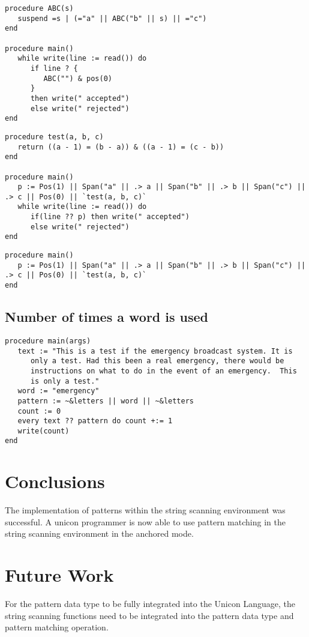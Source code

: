 \documentclass{article}
\begin{document}
\begin{verbatim}
procedure ABC(s)
   suspend =s | (="a" || ABC("b" || s) || ="c")
end

procedure main()
   while write(line := read()) do
      if line ? {
         ABC("") & pos(0)
      } 
      then write(" accepted")
      else write(" rejected")
end
\end{verbatim}

\begin{verbatim}
procedure test(a, b, c)
   return ((a - 1) = (b - a)) & ((a - 1) = (c - b))
end

procedure main()
   p := Pos(1) || Span("a" || .> a || Span("b" || .> b || Span("c") || .> c || Pos(0) || `test(a, b, c)`
   while write(line := read()) do
      if(line ?? p) then write(" accepted")
      else write(" rejected")
end
\end{verbatim}

\begin{verbatim}
procedure main()
   p := Pos(1) || Span("a" || .> a || Span("b" || .> b || Span("c") || .> c || Pos(0) || `test(a, b, c)`
end
\end{verbatim}

\subsection{Number of times a word is used}

\begin{verbatim}
procedure main(args)
   text := "This is a test if the emergency broadcast system. It is 
      only a test. Had this been a real emergency, there would be
      instructions on what to do in the event of an emergency.  This 
      is only a test."
   word := "emergency"
   pattern := ~&letters || word || ~&letters
   count := 0
   every text ?? pattern do count +:= 1
   write(count)
end
\end{verbatim}

\section{Conclusions}
The implementation of patterns within the string scanning environment was successful.  A unicon programmer is now able to use pattern matching in the string scanning environment in the anchored mode.

\section{Future Work}
For the pattern data type to be fully integrated into the Unicon Language, the string scanning functions need to be integrated into the pattern data type and pattern matching operation.  
\end{document}
